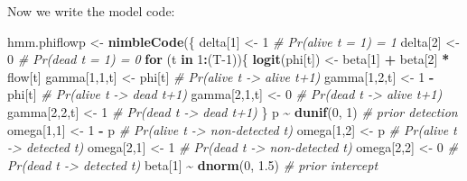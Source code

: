 \documentclass[
  12pt,
]{krantz}
\newenvironment{Shaded}{\begin{snugshade}}{\end{snugshade}}
\newcommand{\CommentTok}[1]{\textcolor[rgb]{0.56,0.35,0.01}{\textit{#1}}}
\newcommand{\ControlFlowTok}[1]{\textcolor[rgb]{0.13,0.29,0.53}{\textbf{#1}}}
\newcommand{\DecValTok}[1]{\textcolor[rgb]{0.00,0.00,0.81}{#1}}
\newcommand{\FloatTok}[1]{\textcolor[rgb]{0.00,0.00,0.81}{#1}}
\newcommand{\FunctionTok}[1]{\textcolor[rgb]{0.13,0.29,0.53}{\textbf{#1}}}
\newcommand{\NormalTok}[1]{#1}
\newcommand{\OtherTok}[1]{\textcolor[rgb]{0.56,0.35,0.01}{#1}}
\newcommand{\SpecialCharTok}[1]{\textcolor[rgb]{0.81,0.36,0.00}{\textbf{#1}}}
\begin{document}
Now we write the model code:

\begin{Shaded}
\begin{Highlighting}[]
\NormalTok{hmm.phiflowp }\OtherTok{\textless{}{-}} \FunctionTok{nimbleCode}\NormalTok{(\{}
\NormalTok{  delta[}\DecValTok{1}\NormalTok{] }\OtherTok{\textless{}{-}} \DecValTok{1}          \CommentTok{\# Pr(alive t = 1) = 1}
\NormalTok{  delta[}\DecValTok{2}\NormalTok{] }\OtherTok{\textless{}{-}} \DecValTok{0}          \CommentTok{\# Pr(dead t = 1) = 0}
  \ControlFlowTok{for}\NormalTok{ (t }\ControlFlowTok{in} \DecValTok{1}\SpecialCharTok{:}\NormalTok{(T}\DecValTok{{-}1}\NormalTok{))\{}
    \FunctionTok{logit}\NormalTok{(phi[t]) }\OtherTok{\textless{}{-}}\NormalTok{ beta[}\DecValTok{1}\NormalTok{] }\SpecialCharTok{+}\NormalTok{ beta[}\DecValTok{2}\NormalTok{] }\SpecialCharTok{*}\NormalTok{ flow[t] }
\NormalTok{    gamma[}\DecValTok{1}\NormalTok{,}\DecValTok{1}\NormalTok{,t] }\OtherTok{\textless{}{-}}\NormalTok{ phi[t]      }\CommentTok{\# Pr(alive t {-}\textgreater{} alive t+1)}
\NormalTok{    gamma[}\DecValTok{1}\NormalTok{,}\DecValTok{2}\NormalTok{,t] }\OtherTok{\textless{}{-}} \DecValTok{1} \SpecialCharTok{{-}}\NormalTok{ phi[t]  }\CommentTok{\# Pr(alive t {-}\textgreater{} dead t+1)}
\NormalTok{    gamma[}\DecValTok{2}\NormalTok{,}\DecValTok{1}\NormalTok{,t] }\OtherTok{\textless{}{-}} \DecValTok{0}        \CommentTok{\# Pr(dead t {-}\textgreater{} alive t+1)}
\NormalTok{    gamma[}\DecValTok{2}\NormalTok{,}\DecValTok{2}\NormalTok{,t] }\OtherTok{\textless{}{-}} \DecValTok{1}        \CommentTok{\# Pr(dead t {-}\textgreater{} dead t+1)}
\NormalTok{  \}}
\NormalTok{  p }\SpecialCharTok{\textasciitilde{}} \FunctionTok{dunif}\NormalTok{(}\DecValTok{0}\NormalTok{, }\DecValTok{1}\NormalTok{) }\CommentTok{\# prior detection}
\NormalTok{  omega[}\DecValTok{1}\NormalTok{,}\DecValTok{1}\NormalTok{] }\OtherTok{\textless{}{-}} \DecValTok{1} \SpecialCharTok{{-}}\NormalTok{ p    }\CommentTok{\# Pr(alive t {-}\textgreater{} non{-}detected t)}
\NormalTok{  omega[}\DecValTok{1}\NormalTok{,}\DecValTok{2}\NormalTok{] }\OtherTok{\textless{}{-}}\NormalTok{ p        }\CommentTok{\# Pr(alive t {-}\textgreater{} detected t)}
\NormalTok{  omega[}\DecValTok{2}\NormalTok{,}\DecValTok{1}\NormalTok{] }\OtherTok{\textless{}{-}} \DecValTok{1}        \CommentTok{\# Pr(dead t {-}\textgreater{} non{-}detected t)}
\NormalTok{  omega[}\DecValTok{2}\NormalTok{,}\DecValTok{2}\NormalTok{] }\OtherTok{\textless{}{-}} \DecValTok{0}        \CommentTok{\# Pr(dead t {-}\textgreater{} detected t)}
\NormalTok{  beta[}\DecValTok{1}\NormalTok{] }\SpecialCharTok{\textasciitilde{}} \FunctionTok{dnorm}\NormalTok{(}\DecValTok{0}\NormalTok{, }\FloatTok{1.5}\NormalTok{) }\CommentTok{\# prior intercept}

\end{Highlighting}
\end{Shaded}
\end{document}
